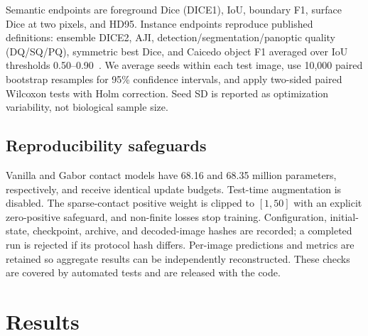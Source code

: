 \documentclass{article}
\begin{document}
Semantic endpoints are foreground Dice (DICE1), IoU, boundary F1, surface Dice at two pixels, and HD95. Instance endpoints reproduce published definitions: ensemble DICE2, AJI, detection/segmentation/panoptic quality (DQ/SQ/PQ), symmetric best Dice, and Caicedo object F1 averaged over IoU thresholds 0.50--0.90~\cite{caicedo2019evaluation}. We average seeds within each test image, use 10,000 paired bootstrap resamples for 95\% confidence intervals, and apply two-sided paired Wilcoxon tests with Holm correction. Seed SD is reported as optimization variability, not biological sample size.

\subsection{Reproducibility safeguards}
Vanilla and Gabor contact models have 68.16 and 68.35 million parameters, respectively, and receive identical update budgets. Test-time augmentation is disabled. The sparse-contact positive weight is clipped to $[1,50]$ with an explicit zero-positive safeguard, and non-finite losses stop training. Configuration, initial-state, checkpoint, archive, and decoded-image hashes are recorded; a completed run is rejected if its protocol hash differs. Per-image predictions and metrics are retained so aggregate results can be independently reconstructed. These checks are covered by automated tests and are released with the code.

\section{Results}
\begin{table}[t]
\centering\footnotesize
\caption{Official BBBC039 test results, mean (seed SD), $n=10$. Literature rows use the same split and published metric definitions.}
\label{tab:instance}
\setlength{\tabcolsep}{3.1pt}
\end{table}
\end{document}
